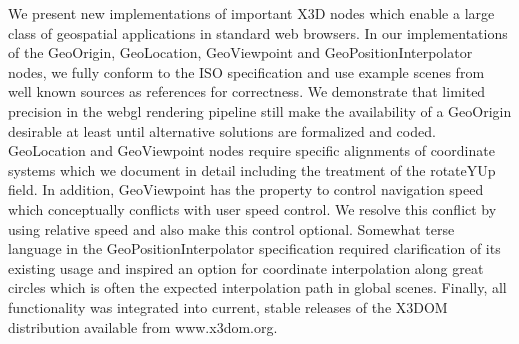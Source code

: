 \documentclass{acmsiggraph}                     %
\begin{document}
We present new implementations of important X3D nodes which enable a large class of geospatial applications in standard web browsers. In our implementations of the GeoOrigin, GeoLocation, GeoViewpoint and GeoPositionInterpolator nodes, we fully conform to the ISO specification and use example scenes from well known sources as references for correctness. We demonstrate that limited precision in the webgl rendering pipeline still make the availability of a GeoOrigin desirable at least until alternative solutions are formalized and coded. GeoLocation and GeoViewpoint nodes require specific alignments of coordinate systems which we document in detail including the treatment of the rotateYUp field. In addition, GeoViewpoint has the property to control navigation speed which conceptually conflicts with user speed control. We resolve this conflict by using relative speed and also make this control optional. Somewhat terse language in the GeoPositionInterpolator specification required clarification of its existing usage and inspired an option for coordinate interpolation along great circles which is often the expected interpolation path in global scenes. Finally, all functionality was integrated into current, stable releases of the X3DOM distribution available from www.x3dom.org.








\nocite{*}

\end{document}
